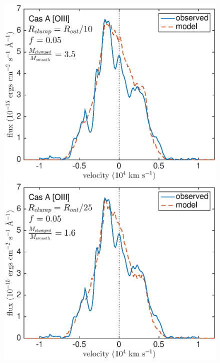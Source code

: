\begin{figure}
\centering
\includegraphics[scale=0.43,clip=true, trim=30 0 50 20]{chapters/chapter6/figs/CasA/clumped/CasA_OIII_c10_f0_05}
\includegraphics[scale=0.43,clip=true, trim=30 0 40 20]{chapters/chapter6/figs/CasA/clumped/CasA_OIII_c25_f0_05}


\end{figure}
